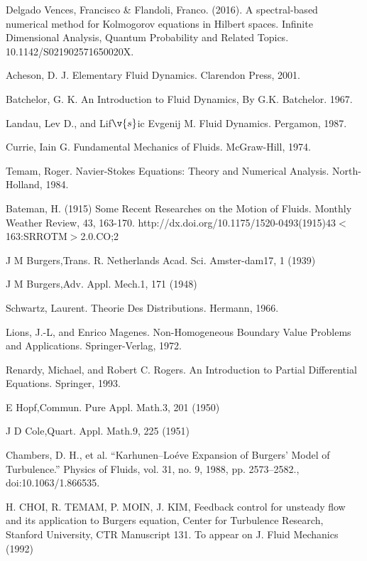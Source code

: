 
\begin{thebibliography}{X}

 Delgado Vences, Francisco \& Flandoli, Franco. (2016). A spectral-based numerical method for Kolmogorov equations in Hilbert spaces. Infinite Dimensional Analysis, Quantum Probability and Related Topics. 10.1142/S021902571650020X. 

 Acheson, D. J. Elementary Fluid Dynamics. Clarendon Press, 2001.

 Batchelor, G. K. An Introduction to Fluid Dynamics, By G.K. Batchelor. 1967.

 Landau, Lev D., and Lif$\v{s}$ic Evgenij M. Fluid Dynamics. Pergamon, 1987.

 Currie, Iain G. Fundamental Mechanics of Fluids. McGraw-Hill, 1974.

 Temam, Roger. Navier-Stokes Equations: Theory and Numerical Analysis. North-Holland, 1984.

 Bateman, H. (1915) Some Recent Researches on the Motion of Fluids. Monthly Weather Review, 43, 163-170. http://dx.doi.org/10.1175/1520-0493(1915)43$<$163:SRROTM$>$2.0.CO;2

 J M Burgers,Trans. R. Netherlands Acad. Sci. Amster-dam17, 1 (1939)

 J M Burgers,Adv. Appl. Mech.1, 171 (1948)

 Schwartz, Laurent. Theorie Des Distributions. Hermann, 1966.

 Lions, J.-L, and Enrico Magenes. Non-Homogeneous Boundary Value Problems and Applications. Springer-Verlag, 1972.

 Renardy, Michael, and Robert C. Rogers. An Introduction to Partial Differential Equations. Springer, 1993.	

 E Hopf,Commun. Pure Appl. Math.3, 201 (1950)

 J D Cole,Quart. Appl. Math.9, 225 (1951)

 Chambers, D. H., et al. “Karhunen–Loéve Expansion of Burgers’ Model of Turbulence.” Physics of Fluids, vol. 31, no. 9, 1988, pp. 2573–2582., doi:10.1063/1.866535.

 H. CHOI, R. TEMAM, P. MOIN, J. KIM, Feedback control for unsteady flow and its application to Burgers equation, Center for Turbulence Research, Stanford University, CTR Manuscript 131. To appear on J. Fluid Mechanics (1992)


\end{thebibliography}

